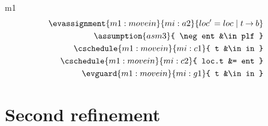 \documentclass[12pt]{amsart}
\begin{document}
\begin{machine}{m1}
\begin{align*}
\evassignment{m1:movein}{mi:a2}
	{ loc' = loc \1| t \tfun b }
\\ \assumption{asm3}
	{ \neg ent &\in plf }
\\ \cschedule{m1:movein}{mi:c1}{ t &\in in } 
\\ \cschedule{m1:movein}{mi:c2}{ loc.t &= ent }
\\ \evguard{m1:movein}{mi:g1}{ t &\in in }
\end{align*}
%
\end{machine}

\section{Second refinement}
\end{document}
